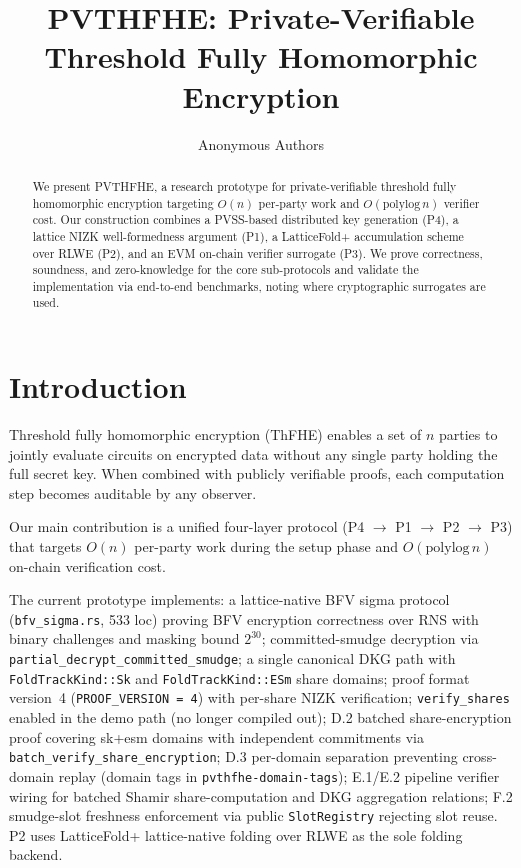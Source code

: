 \documentclass{llncs}
\title{PVTHFHE: Private-Verifiable Threshold Fully Homomorphic Encryption}
\author{Anonymous Authors}
\institute{Under Submission}
\begin{document}
\maketitle

\begin{abstract}
We present PVTHFHE, a research prototype for private-verifiable threshold fully homomorphic encryption
targeting $O(n)$ per-party work and $O(\text{polylog}\, n)$ verifier cost.
Our construction combines a PVSS-based distributed key generation (P4), a lattice NIZK
well-formedness argument (P1), a LatticeFold+ accumulation scheme over RLWE (P2), and an
EVM on-chain verifier surrogate (P3). We prove correctness, soundness, and zero-knowledge for the core sub-protocols and validate the implementation via end-to-end benchmarks, noting where cryptographic surrogates are used.
\end{abstract}

\section{Introduction}

Threshold fully homomorphic encryption (ThFHE) enables a set of $n$ parties to jointly evaluate
circuits on encrypted data without any single party holding the full secret key. When combined
with publicly verifiable proofs, each computation step becomes auditable by any observer.

Our main contribution is a unified four-layer protocol (P4 $\to$ P1 $\to$ P2 $\to$ P3) that
targets $O(n)$ per-party work during the setup phase and $O(\text{polylog}\, n)$ on-chain
verification cost.

The current prototype implements: a lattice-native BFV sigma protocol (\texttt{bfv\_sigma.rs},
533 loc) proving BFV encryption correctness over RNS with binary challenges and masking bound
$2^{30}$; committed-smudge decryption via \texttt{partial\_decrypt\_committed\_smudge}; a
single canonical DKG path with \texttt{FoldTrackKind::Sk} and \texttt{FoldTrackKind::ESm} share domains;
proof format version~4 (\texttt{PROOF\_VERSION = 4}) with per-share NIZK verification;
\texttt{verify\_shares} enabled in the demo path (no longer compiled out); D.2 batched
share-encryption proof covering sk+esm domains with independent commitments via
\texttt{batch\_verify\_share\_encryption}; D.3 per-domain separation preventing
cross-domain replay (domain tags in \texttt{pvthfhe-domain-tags}); E.1/E.2 pipeline verifier
wiring for batched Shamir share-computation and DKG aggregation relations; F.2 smudge-slot
freshness enforcement via public \texttt{SlotRegistry} rejecting slot reuse.
P2 uses LatticeFold+ lattice-native folding over RLWE as the sole folding backend.
\end{document}
